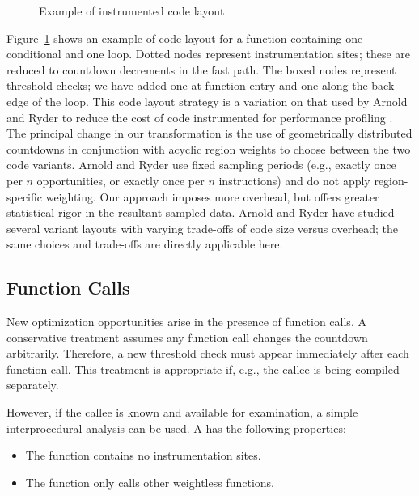 \begin{figure}
  \centering
  
  \caption{Example of instrumented code layout}
  \label{fig:code-layout}
\end{figure}

Figure~\ref{fig:code-layout} shows an example of code layout for a
function containing one conditional and one loop.  Dotted nodes
represent instrumentation sites; these are reduced to countdown
decrements in the fast path.  The boxed nodes represent threshold
checks; we have added one at function entry and one along the back
edge of the loop.  This code layout strategy is a variation on that
used by Arnold and Ryder to reduce the cost of code instrumented for
performance profiling \cite{Arnold:2001:FRC}.  The principal change in
our transformation is the use of geometrically distributed countdowns
in conjunction with acyclic region weights to choose between the two
code variants.  Arnold and Ryder use fixed sampling periods (e.g.,
exactly once per $n$ opportunities, or exactly once per $n$
instructions) and do not apply region-specific weighting.  Our
approach imposes more overhead, but offers greater statistical rigor
in the resultant sampled data.  Arnold and Ryder have studied several
variant layouts with varying trade-offs of code size versus overhead;
the same choices and trade-offs are directly applicable here.

\subsection{Function Calls}
\label{sec:framework:calls}

New optimization opportunities arise in the presence of function
calls.  A conservative treatment assumes any function call changes the
countdown arbitrarily.  Therefore, a new threshold check must appear
immediately after each function call.  This treatment is appropriate
if, e.g., the callee is being compiled separately.

However, if the callee is known and available for examination, a
simple interprocedural analysis can be used.  A  has the following properties:

\begin{itemize}
\item The function contains no instrumentation sites.
\item The function only calls other weightless functions.
\end{itemize}

